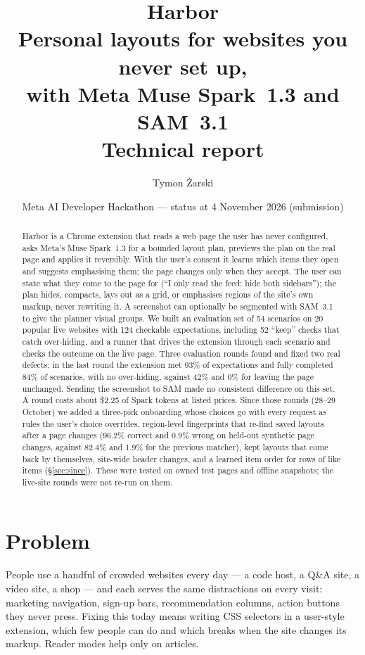 \documentclass[10pt,a4paper]{article}
\title{\textbf{Harbor}\\[2pt]\large Personal layouts for websites you never set up,\\ with Meta Muse Spark~1.3 and SAM~3.1\\[2pt]\normalsize Technical report}
\author{Tymon Żarski}
\date{Meta AI Developer Hackathon --- status at 4 November 2026 (submission)}
\begin{document}
\maketitle

\begin{abstract}
\noindent Harbor is a Chrome extension that reads a web page the user has never configured, asks Meta's Muse Spark~1.3 for a bounded layout plan, previews the plan on the real page and applies it reversibly. With the user's consent it learns which items they open and suggests emphasising them; the page changes only when they accept. The user can state what they come to the page for (``I only read the feed: hide both sidebars''); the plan hides, compacts, lays out as a grid, or emphasises regions of the site's own markup, never rewriting it. A screenshot can optionally be segmented with SAM~3.1 to give the planner visual groups. We built an evaluation set of 54 scenarios on 20 popular live websites with 124 checkable expectations, including 52 ``keep'' checks that catch over-hiding, and a runner that drives the extension through each scenario and checks the outcome on the live page. Three evaluation rounds found and fixed two real defects; in the last round the extension met 93\% of expectations and fully completed 84\% of scenarios, with no over-hiding, against 42\% and 0\% for leaving the page unchanged. Sending the screenshot to SAM made no consistent difference on this set. A round costs about \$2.25 of Spark tokens at listed prices. Since those rounds (28--29 October) we added a three-pick onboarding whose choices go with every request as rules the user's choice overrides, region-level fingerprints that re-find saved layouts after a page changes (96.2\% correct and 0.9\% wrong on held-out synthetic page changes, against 82.4\% and 1.9\% for the previous matcher), kept layouts that come back by themselves, site-wide header changes, and a learned item order for rows of like items (\S\ref{sec:since}). These were tested on owned test pages and offline snapshots; the live-site rounds were not re-run on them.
\end{abstract}

\section{Problem}
People use a handful of crowded websites every day --- a code host, a Q\&A site, a video site, a shop --- and each serves the same distractions on every visit: marketing navigation, sign-up bars, recommendation columns, action buttons they never press. Fixing this today means writing CSS selectors in a user-style extension, which few people can do and which breaks when the site changes its markup. Reader modes help only on articles.
\end{document}
